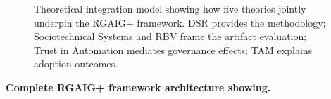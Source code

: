 \begin{figure}[!htbp]
{%
}%
\caption[Theoretical Integration: DSR → RGAIG+ → Trust → TAM]{Theoretical integration model showing how five theories jointly underpin the RGAIG+ framework. DSR provides the methodology; Sociotechnical Systems and RBV frame the artifact evaluation; Trust in Automation mediates governance effects; TAM explains adoption outcomes.}
\label{fig:rgaig_theoretical_integration_theory}
\end{figure}

\noindent\textbf{Complete RGAIG+ framework architecture showing.}

